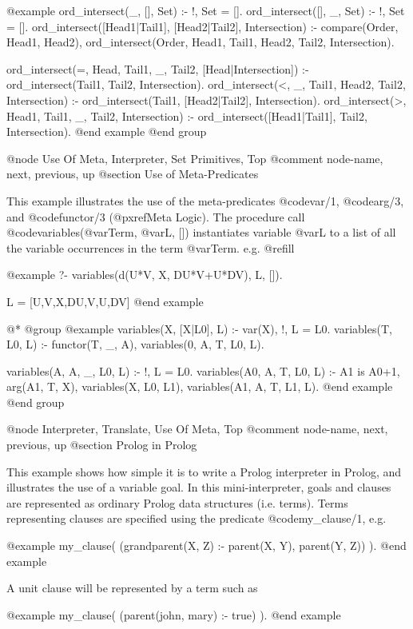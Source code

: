 {{{{{@example
ord_intersect(_, [], Set) :- !, Set = [].
ord_intersect([], _, Set) :- !, Set = [].
ord_intersect([Head1|Tail1], [Head2|Tail2], Intersection) :-
        compare(Order, Head1, Head2),
        ord_intersect(Order, Head1, Tail1, Head2, Tail2, Intersection).
 
ord_intersect(=, Head,  Tail1, _,     Tail2, [Head|Intersection]) :-
        ord_intersect(Tail1, Tail2, Intersection).
ord_intersect(<, _,     Tail1, Head2, Tail2, Intersection) :-
        ord_intersect(Tail1, [Head2|Tail2], Intersection).
ord_intersect(>, Head1, Tail1, _,     Tail2, Intersection) :-
        ord_intersect([Head1|Tail1], Tail2, Intersection).
@end example
@end group

@node Use Of Meta, Interpreter, Set Primitives, Top
@comment  node-name,  next,  previous,  up
@section Use of Meta-Predicates

This example illustrates the use of the meta-predicates @code{var/1},
@code{arg/3}, and @code{functor/3} (@pxref{Meta Logic}).  The procedure
call @code{variables(@var{Term}, @var{L}, [])} instantiates variable
@var{L} to a list of all the variable occurrences in the term
@var{Term}.  e.g.
@refill

@example
?- variables(d(U*V, X, DU*V+U*DV), L, []).

L = [U,V,X,DU,V,U,DV]
@end example

 @*
@group
@example
variables(X, [X|L0], L) :- var(X), !, L = L0.
variables(T, L0, L) :- 
        functor(T, _, A), 
        variables(0, A, T, L0, L).

variables(A, A, _, L0, L) :- !, L = L0.
variables(A0, A, T, L0, L) :- 
        A1 is A0+1,
        arg(A1, T, X),
        variables(X, L0, L1),
        variables(A1, A, T, L1, L).
@end example
@end group

@node Interpreter, Translate, Use Of Meta, Top
@comment  node-name,  next,  previous,  up
@section Prolog in Prolog

This example shows how simple it is to write a Prolog interpreter in
Prolog, and illustrates the use of a variable goal.  In this
mini-interpreter, goals and clauses are represented as ordinary Prolog
data structures (i.e. terms).  Terms representing clauses are specified
using the predicate @code{my_clause/1}, e.g.

@example
my_clause( (grandparent(X, Z) :- parent(X, Y), parent(Y, Z)) ).
@end example

A unit clause will be represented by a term such as

@example
my_clause( (parent(john, mary) :- true) ).
@end example

}}}}}
